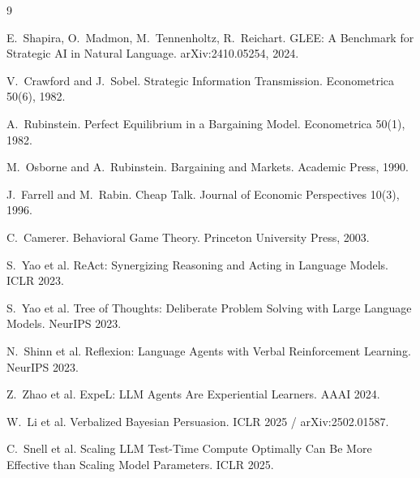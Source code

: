 \documentclass{article}
\begin{document}
\begin{thebibliography}{9}\small

E.~Shapira, O.~Madmon, M.~Tennenholtz, R.~Reichart.
\newblock GLEE: A Benchmark for Strategic AI in Natural Language.
\newblock arXiv:2410.05254, 2024.

V.~Crawford and J.~Sobel.
\newblock Strategic Information Transmission.
\newblock Econometrica 50(6), 1982.

A.~Rubinstein.
\newblock Perfect Equilibrium in a Bargaining Model.
\newblock Econometrica 50(1), 1982.

M.~Osborne and A.~Rubinstein.
\newblock Bargaining and Markets.
\newblock Academic Press, 1990.

J.~Farrell and M.~Rabin.
\newblock Cheap Talk.
\newblock Journal of Economic Perspectives 10(3), 1996.

C.~Camerer.
\newblock Behavioral Game Theory.
\newblock Princeton University Press, 2003.

S.~Yao et al.
\newblock ReAct: Synergizing Reasoning and Acting in Language Models.
\newblock ICLR 2023.

S.~Yao et al.
\newblock Tree of Thoughts: Deliberate Problem Solving with Large Language Models.
\newblock NeurIPS 2023.

N.~Shinn et al.
\newblock Reflexion: Language Agents with Verbal Reinforcement Learning.
\newblock NeurIPS 2023.

Z.~Zhao et al.
\newblock ExpeL: LLM Agents Are Experiential Learners.
\newblock AAAI 2024.

W.~Li et al.
\newblock Verbalized Bayesian Persuasion.
\newblock ICLR 2025 / arXiv:2502.01587.

C.~Snell et al.
\newblock Scaling LLM Test-Time Compute Optimally Can Be More Effective than Scaling Model Parameters.
\newblock ICLR 2025.

\end{thebibliography}


\end{document}
